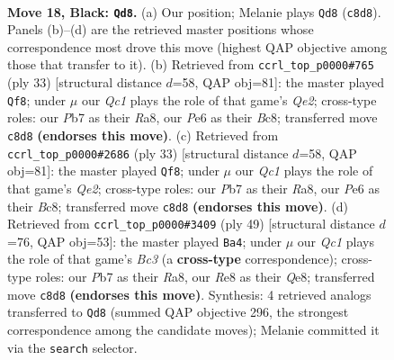 \documentclass[11pt]{article}
\begin{document}
\clearpage

\begin{figure}[p]\centering
\begin{subfigure}{0.46\textwidth}\centering
\resizebox{\linewidth}{!}{%
\newchessgame
\chessboard[
  setfen={rnq1r1k1/pp1bbppp/4pn2/2Pp4/N2P3N/P6P/1P1B1PP1/1BRQR1K1 b - - 2 18},
  showmover=false,
  pgfstyle=straightmove, color=movearrow, markmove={c8-d8}
]}
\caption{}
\end{subfigure}\hfill
\begin{subfigure}{0.46\textwidth}\centering
\resizebox{\linewidth}{!}{%
\newchessgame
\chessboard[
  setfen={r1b1r1k1/3nqpbp/pn1p2p1/2pP4/1p2PB2/3B1NNP/PP3PP1/2QRR1K1 b - - 5 17},
  showmover=false,
  pgfstyle=straightmove, color=movearrow, markmove={e7-f8}
]}
\caption{}
\end{subfigure}
\\[4pt]
\begin{subfigure}{0.46\textwidth}\centering
\resizebox{\linewidth}{!}{%
\newchessgame
\chessboard[
  setfen={r1b1r1k1/3nqpbp/pn1p2p1/2pP4/1p2PB2/3B1NNP/PP3PP1/2QRR1K1 b - - 5 17},
  showmover=false,
  pgfstyle=straightmove, color=movearrow, markmove={e7-f8}
]}
\caption{}
\end{subfigure}\hfill
\begin{subfigure}{0.46\textwidth}\centering
\resizebox{\linewidth}{!}{%
\newchessgame
\chessboard[
  setfen={r2nq3/2p1rpbk/1pb2npp/4p3/1P2P3/1BP2NNP/2QB1PP1/2R1R1K1 b - - 0 25},
  showmover=false,
  pgfstyle=straightmove, color=movearrow, markmove={c6-a4}
]}
\caption{}
\end{subfigure}
\caption{\textbf{Move 18, Black: \texttt{Qd8}.} (a) Our position; Melanie plays \texttt{Qd8} (\texttt{c8d8}). Panels (b)--(d) are the retrieved master positions whose correspondence most drove this move (highest QAP objective among those that transfer to it). (b) Retrieved from \texttt{ccrl\_top\_p0000\#765} (ply 33) [structural distance $d$=58, QAP obj=81]: the master played \texttt{Qf8}; under $\mu$ our \emph{Qc1} plays the role of that game's \emph{Qe2}; cross-type roles: our \emph{P}b7 as their \emph{R}a8, our \emph{P}e6 as their \emph{B}c8; transferred move \texttt{c8d8} \textbf{(endorses this move)}. (c) Retrieved from \texttt{ccrl\_top\_p0000\#2686} (ply 33) [structural distance $d$=58, QAP obj=81]: the master played \texttt{Qf8}; under $\mu$ our \emph{Qc1} plays the role of that game's \emph{Qe2}; cross-type roles: our \emph{P}b7 as their \emph{R}a8, our \emph{P}e6 as their \emph{B}c8; transferred move \texttt{c8d8} \textbf{(endorses this move)}. (d) Retrieved from \texttt{ccrl\_top\_p0000\#3409} (ply 49) [structural distance $d$=76, QAP obj=53]: the master played \texttt{Ba4}; under $\mu$ our \emph{Qc1} plays the role of that game's \emph{Bc3} (a \textbf{cross-type} correspondence); cross-type roles: our \emph{P}b7 as their \emph{R}a8, our \emph{R}e8 as their \emph{Q}e8; transferred move \texttt{c8d8} \textbf{(endorses this move)}. Synthesis: 4 retrieved analogs transferred to \texttt{Qd8} (summed QAP objective 296, the strongest correspondence among the candidate moves); Melanie committed it via the \texttt{search} selector.}
\label{fig:thought-m35}
\end{figure}
\end{document}
